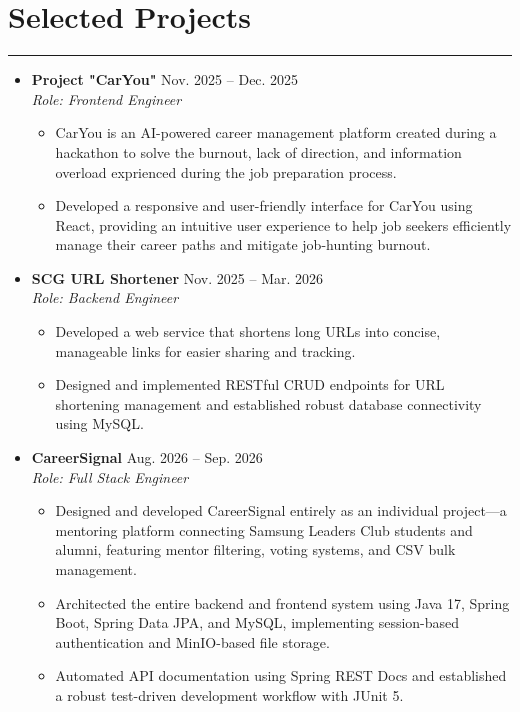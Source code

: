 \documentclass[letterpaper, 10pt]{article}
\begin{document}
\section*{Selected Projects}
\hrule
\vspace{4pt}
\begin{itemize}
    \item[]
        \textbf{Project "CarYou"} \hfill Nov. 2025 -- Dec. 2025 \\
        \textit{Role: Frontend Engineer}
        \begin{itemize}
            \item CarYou is an AI-powered career management platform created during a hackathon to solve the burnout, lack of direction, and information overload exprienced during the job preparation process.
            \item Developed a responsive and user-friendly interface for CarYou using React, providing an intuitive user experience to help job seekers efficiently manage their career paths and mitigate job-hunting burnout.
        \end{itemize}
    \item[]
        \textbf{SCG URL Shortener} \hfill Nov. 2025 -- Mar. 2026 \\
        \textit{Role: Backend Engineer}
        \begin{itemize}
            \item Developed a web service that shortens long URLs into concise, manageable links for easier sharing and tracking.
            \item Designed and implemented RESTful CRUD endpoints for URL shortening management and established robust database connectivity using MySQL.
        \end{itemize}
    \item[]
        \textbf{CareerSignal} \hfill Aug. 2026 -- Sep. 2026 \\
        \textit{Role: Full Stack Engineer}
        \begin{itemize}
            \item Designed and developed CareerSignal entirely as an individual project—a mentoring platform connecting Samsung Leaders Club students and alumni, featuring mentor filtering, voting systems, and CSV bulk management.
            \item Architected the entire backend and frontend system using Java 17, Spring Boot, Spring Data JPA, and MySQL, implementing session-based authentication and MinIO-based file storage.
            \item Automated API documentation using Spring REST Docs and established a robust test-driven development workflow with JUnit 5.
        \end{itemize}
\end{itemize}
\end{document}
